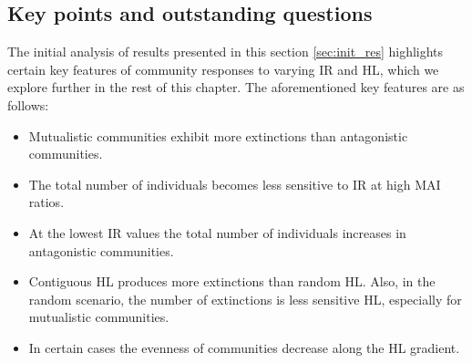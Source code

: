 
\subsection{Key points and outstanding questions}
\label{sec:questions}


The initial analysis of results presented in this section \ref{sec:init_res} highlights certain key features of community responses to varying IR and HL, which we explore further in the rest of this chapter. The aforementioned key features are as follows:

\begin{itemize}
	\item Mutualistic communities exhibit more extinctions than antagonistic communities.
	\item The total number of individuals becomes less sensitive to IR at high MAI ratios.
	\item At the lowest IR values the total number of individuals increases in antagonistic communities.
	\item Contiguous HL produces more extinctions than random HL. Also, in the random scenario, the number of extinctions is less sensitive HL, especially for mutualistic communities.
	\item In certain cases the evenness of communities decrease along the HL gradient.
\end{itemize}

